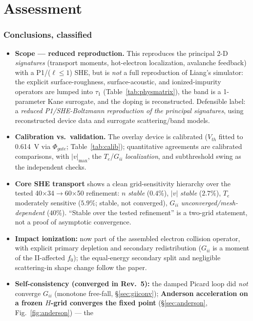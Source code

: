 \documentclass[11pt]{article}
\begin{document}
\part{Assessment}
\section{Conclusions, classified}\label{sec:concl}
\begin{itemize}[leftmargin=1.4em,itemsep=2pt]
\item \textbf{Scope --- reduced reproduction.} This reproduces the principal 2-D \emph{signatures}
(transport moments, hot-electron localization, avalanche feedback) with a P1/($\ell\le1$) SHE, but
is \emph{not} a full reproduction of Liang's simulator: the explicit surface-roughness,
surface-acoustic, and ionized-impurity operators are lumped into $\tau_1$
(Table~\ref{tab:physmatrix}), the band is a 1-parameter Kane surrogate, and the doping is
reconstructed. Defensible label: a \emph{reduced P1/SHE-Boltzmann reproduction of the principal
signatures}, using reconstructed device data and surrogate scattering/band models.
\item \textbf{Calibration vs.\ validation.} The overlay device is calibrated ($V_{th}$ fitted to
\SI{0.614}{V} via $\Phi_{gate}$; Table~\ref{tab:calib}); quantitative agreements are calibrated
comparisons, with $|v|_{\max}$, the $T_e$/$G_{ii}$ \emph{localization}, and subthreshold swing as
the independent checks.
\item \textbf{Core SHE transport} shows a clean grid-sensitivity hierarchy over the tested
40$\times$34$\to$60$\times$50 refinement: $n$ \emph{stable} ($0.4\%$), $|v|$ \emph{stable}
($2.7\%$), $T_e$ moderately sensitive ($5.9\%$; stable, not converged), $G_{ii}$
\emph{unconverged/mesh-dependent} ($40\%$). ``Stable over the tested refinement'' is a two-grid
statement, not a proof of asymptotic convergence.
\item \textbf{Impact ionization:} now part of the assembled electron collision operator, with
explicit primary depletion and secondary redistribution ($G_{ii}$ is a moment of the II-affected
$f_0$); the equal-energy secondary split and negligible scattering-in shape change follow the
paper.
\item \textbf{Self-consistency (converged in Rev.~5):} the damped Picard loop did \emph{not}
converge $G_{ii}$ (monotone free-fall, \S\ref{sec:giiconv}); \textbf{Anderson acceleration on a
frozen $H$-grid converges the fixed point} (\S\ref{sec:anderson}, Fig.~\ref{fig:anderson}) --- the

\end{itemize}
\end{document}
